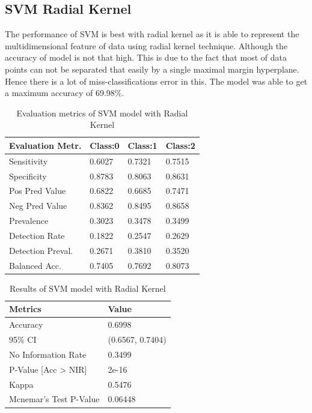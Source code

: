 \documentclass[11pt,a4paper]{article}
\begin{document}
 \subsection{SVM Radial Kernel}
 The performance of SVM is best with radial kernel as it is able to represent the multidimensional feature of data using radial kernel technique. Although the accuracy of model is not that high. This is due to the fact that most of data points can not be separated that easily by a single maximal margin hyperplane. Hence there is a lot of miss-classifications error in this. The model was able to get a maximum accuracy of 69.98\%.
 \begin{table}[h]
 	\centering
 	\caption{Evaluation metrics of SVM model with Radial Kernel}
 	\begin{tabular}{|l|l|l|l|} 
 		\hline
 		\textbf{Evaluation Metr.} & \textbf{Class:0} & \textbf{Class:1} & \textbf{Class:2}  \\ 
 		\hline
 		Sensitivity                & 0.6027           & 0.7321           & 0.7515            \\ 
 		\hline
 		Specificity                & 0.8783           & 0.8063           & 0.8631            \\ 
 		\hline
 		Pos Pred Value             & 0.6822           & 0.6685           & 0.7471            \\ 
 		\hline
 		Neg Pred Value             & 0.8362           & 0.8495           & 0.8658            \\ 
 		\hline
 		Prevalence                 & 0.3023           & 0.3478           & 0.3499            \\ 
 		\hline
 		Detection Rate             & 0.1822           & 0.2547           & 0.2629            \\ 
 		\hline
 		Detection Preval.       & 0.2671           & 0.3810           & 0.3520            \\ 
 		\hline
 		Balanced Acc.          & 0.7405           & 0.7692           & 0.8073            \\
 		\hline
 	\end{tabular}
 \end{table} 
\begin{table}[h]
	\centering
	\caption{Results of SVM model with Radial Kernel}
	\begin{tabular}{|l|l|} 
		\hline
		\textbf{Metrics}                 & \textbf{Value}    \\ 
		\hline
		Accuracy                         & 0.6998            \\ 
		\hline
		95\% CI                          & (0.6567, 0.7404)  \\ 
		\hline
		No Information Rate              & 0.3499            \\ 
		\hline
		P-Value [Acc \textgreater{} NIR] &  2e-16            \\ 
		\hline
		Kappa                            & 0.5476            \\ 
		\hline
		Mcnemar's Test P-Value           & 0.06448           \\
		\hline
	\end{tabular}
\end{table}
\end{document}
